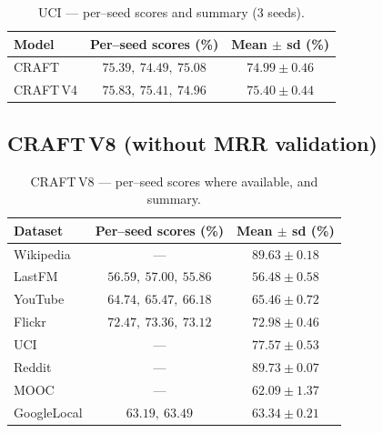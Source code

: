 \documentclass[11pt]{article}
\begin{document}
\begin{table}[H]
\centering
\caption{UCI --- per--seed scores and summary (3 seeds).}
\begin{tabular}{lcc}
\toprule
Model & Per--seed scores (\%) & Mean $\pm$ sd (\%) \\
\midrule
CRAFT      & $75.39,\ 74.49,\ 75.08$ & $74.99 \pm 0.46$ \\
CRAFT\,V4  & $75.83,\ 75.41,\ 74.96$ & $\mathbf{75.40 \pm 0.44}$ \\
\bottomrule
\end{tabular}
\end{table}

\FloatBarrier

\subsection{CRAFT\,V8 (without MRR validation)}
\label{sec:v8-results}

\begin{table}[H]
\centering
\caption{CRAFT\,V8 --- per--seed scores where available, and summary.}
\begin{tabular}{lcc}
\toprule
Dataset & Per--seed scores (\%) & Mean $\pm$ sd (\%) \\
\midrule
Wikipedia   & ---                       & $89.63 \pm 0.18$ \\
LastFM      & $56.59,\ 57.00,\ 55.86$   & $56.48 \pm 0.58$ \\
YouTube     & $64.74,\ 65.47,\ 66.18$   & $65.46 \pm 0.72$ \\
Flickr      & $72.47,\ 73.36,\ 73.12$   & $72.98 \pm 0.46$ \\
UCI         & ---                       & $77.57 \pm 0.53$ \\
Reddit      & ---                       & $89.73 \pm 0.07$ \\
MOOC        & ---                       & $62.09 \pm 1.37$ \\
GoogleLocal & $63.19,\ 63.49$           & $63.34 \pm 0.21$ \\
\bottomrule
\end{tabular}
\end{table}
\end{document}
